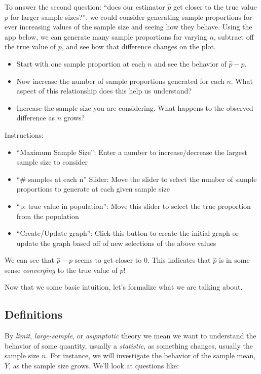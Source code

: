 \documentclass[
]{article}
\providecommand{\tightlist}{%
  \setlength{\itemsep}{0pt}\setlength{\parskip}{0pt}}
\begin{document}
To answer the second question: ``does our estimator \(\hat{p}\) get
closer to the true value \(p\) for larger sample sizes?'', we could
consider generating sample proportions for ever increasing values of the
sample size and seeing how they behave. Using the app below, we can
generate many sample proportions for varying \(n\), subtract off the
true value of \(p\), and see how that difference changes on the plot.

\begin{itemize}
\tightlist
\item
  Start with one sample proportion at each \(n\) and see the behavior of
  \(\hat{p}-p\).
\item
  Now increase the number of sample proportions generated for each
  \(n\). What aspect of this relationship does this help us understand?
\item
  Increase the sample size you are considering. What happens to the
  observed difference as \(n\) grows?
\end{itemize}

Instructions:

\begin{itemize}
\tightlist
\item
  ``Maximum Sample Size'': Enter a number to increase/decrease the
  largest sample size to consider
\item
  ``\# samples at each n'' Slider: Move the slider to select the number
  of sample proportions to generate at each given sample size
\item
  ``p: true value in population'': Move this slider to select the true
  proportion from the population
\item
  ``Create/Update graph'': Click this button to create the initial graph
  or update the graph based off of new selections of the above values
\end{itemize}

We can see that \(\hat{p}-p\) seems to get closer to 0. This indicates
that \(\hat{p}\) is in some sense \emph{converging} to the true value of
\(p\)!

Now that we some basic intuition, let's formalize what we are talking
about.

\hypertarget{definitions}{%
\subsection{Definitions}\label{definitions}}

By \emph{limit}, \emph{large-sample}, or \emph{asymptotic} theory we
mean we want to understand the behavior of some quantity, usually a
\emph{statistic}, as something changes, usually the sample size \(n\).
For instance, we will investigate the behavior of the sample mean,
\(\bar{Y}\), as the sample size grows. We'll look at questions like:
\end{document}
